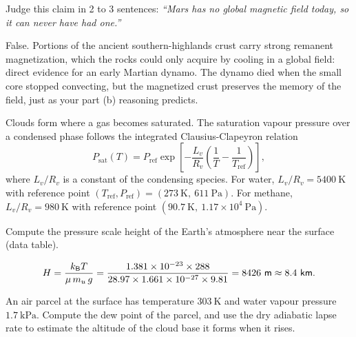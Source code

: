\parti {} Judge this claim in 2 to 3 sentences:
\emph{``Mars has no global magnetic field today, so it can never have had one.''}

\begin{solution}
False.
Portions of the ancient southern-highlands crust carry strong remanent magnetization, which the rocks could only acquire by cooling in a global field: direct evidence for an early Martian dynamo.
The dynamo died when the small core stopped convecting, but the magnetized crust preserves the memory of the field, just as your part (b) reasoning predicts.
\end{solution}



Clouds form where a gas becomes saturated.
The saturation vapour pressure over a condensed phase follows the integrated Clausius-Clapeyron relation
\[
  P_{\mathrm{sat}}(T) = P_{\mathrm{ref}} \exp\!\left[ -\frac{L_v}{R_v} \left( \frac{1}{T} - \frac{1}{T_{\mathrm{ref}}} \right) \right],
\]
where $L_v/R_v$ is a constant of the condensing species.
For water, $L_v/R_v = 5400\ \mathrm{K}$ with reference point $(T_{\mathrm{ref}}, P_{\mathrm{ref}}) = (273\ \mathrm{K},\ 611\ \mathrm{Pa})$.
For methane, $L_v/R_v = 980\ \mathrm{K}$ with reference point $(90.7\ \mathrm{K},\ 1.17 \times 10^{4}\ \mathrm{Pa})$.

\parti {} Compute the pressure scale height of the Earth's atmosphere near the surface (data table).

\begin{solution}
\[
  H = \frac{k_{\mathsf{B}} T}{\mu\, m_u\, g}
    = \frac{1.381 \times 10^{-23} \times 288}{28.97 \times 1.661 \times 10^{-27} \times 9.81}
    = 8426\ \mathsf{m} \approx 8.4\ \mathsf{km}.
\]
\end{solution}

\parti {} An air parcel at the surface has temperature $303\ \mathrm{K}$ and water vapour pressure $1.7\ \mathrm{kPa}$.
Compute the dew point of the parcel, and use the dry adiabatic lapse rate to estimate the altitude of the cloud base it forms when it rises.

